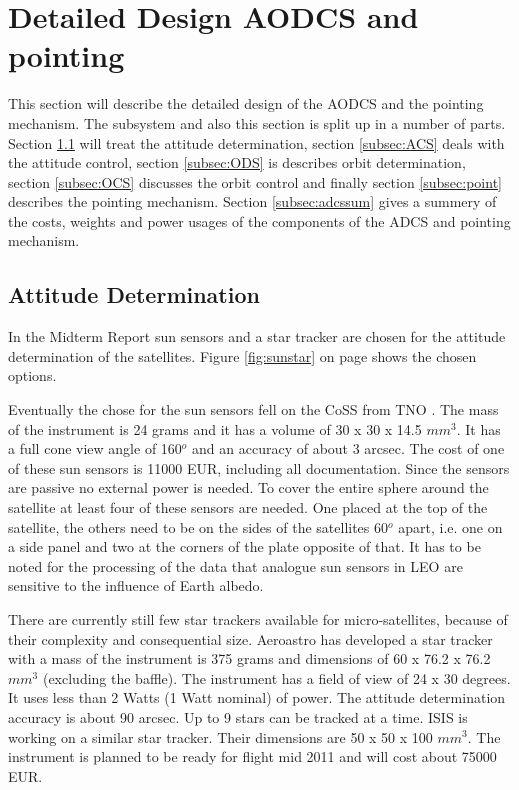 \section{Detailed Design AODCS and pointing}
\label{sec:DDaodcs}
This section will describe the detailed design of the \ac{AODCS} and the pointing mechanism. The subsystem and also this section is split up in a number of parts. Section \ref{subsec:ADS} will treat the attitude determination, section \ref{subsec:ACS} deals with the attitude control, section \ref{subsec:ODS} is describes orbit determination, section \ref{subsec:OCS} discusses the orbit control and finally section \ref{subsec:point} describes the pointing mechanism. Section \ref{subsec:adcssum} gives a summery of the costs, weights and power usages of the components of the \ac{ADCS} and pointing mechanism.

\subsection{Attitude Determination}
\label{subsec:ADS}
In the Midterm Report \cite{midterm} sun sensors and a star tracker are chosen for the attitude determination of the satellites. Figure \ref{fig:sunstar} on page \pageref{fig:sunstar} shows the chosen options.

Eventually the chose for the sun sensors fell on the \ac{CoSS} from TNO \cite{tnoweb}. The mass of the instrument is 24 grams and it has a volume of 30 x 30 x 14.5 $mm^3$. It has a full cone view angle of 160${}^o$ and an accuracy of about 3 arcsec. The cost of one of these sun sensors is 11000 EUR, including all documentation. Since the sensors are passive no external power is needed. To cover the entire sphere around the satellite at least four of these sensors are needed. One placed at the top of the satellite, the others need to be on the sides of the satellites 60${}^o$ apart, i.e. one on a side panel and two at the corners of the plate opposite of that. It has to be noted for the processing of the data that analogue sun sensors in \ac{LEO} are sensitive to the influence of Earth albedo.

There are currently still few star trackers available for micro-satellites, because of their complexity and consequential size. Aeroastro has developed a star tracker with a mass of the instrument is 375 grams and dimensions of 60 x 76.2 x 76.2 $mm^3$ (excluding the baffle). The instrument has a field of view of 24 x 30 degrees. It uses less than 2 Watts (1 Watt nominal) of power. The attitude determination accuracy is about 90 arcsec. Up to 9 stars can be tracked at a time. \ac{ISIS} \cite{cubesatshop} is working on a similar star tracker. Their dimensions are 50 x 50 x 100 $mm^3$. The instrument is planned to be ready for flight mid 2011 and will cost about 75000 EUR.

